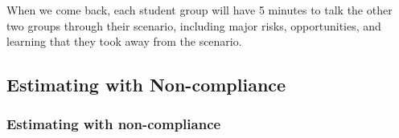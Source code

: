 \documentclass[
]{article}
\begin{document}
When we come back, each student group will have 5 minutes to talk the other two groups through their scenario, including major risks, opportunities, and learning that they took away from the scenario.

\hypertarget{estimating-with-non-compliance}{%
\subsection{Estimating with Non-compliance}\label{estimating-with-non-compliance}}

\hypertarget{estimating-with-non-compliance-1}{%
\subsubsection{Estimating with non-compliance}\label{estimating-with-non-compliance-1}}
\end{document}
